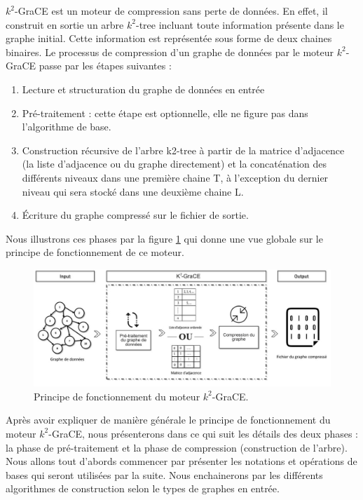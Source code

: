 \documentclass[a4paper,oneside,12pt]{report}
\theoremstyle{definition}
\begin{document}
	
$k^2$-GraCE est un moteur de compression sans perte de données. En effet, il construit en sortie un arbre $k^2$-tree incluant toute information présente dans le graphe initial. Cette information est représentée sous forme de deux chaines binaires. Le processus de compression d'un graphe de données par le moteur $k^2$-GraCE passe par les étapes suivantes :
\begin{enumerate}
\item Lecture et structuration du graphe de données en entrée 
\item Pré-traitement : cette étape est optionnelle, elle ne figure pas dans l'algorithme de base. 
\item Construction récursive de l'arbre k2-tree à partir de la matrice d'adjacence (la liste d'adjacence ou du graphe directement) et la concaténation des différents niveaux dans une première chaine T, à l'exception du dernier niveau qui sera stocké dans une deuxième chaine L.

\item Écriture du graphe compressé sur le fichier de sortie.
\end{enumerate}

Nous illustrons ces phases par la figure \ref{k2grace} qui donne une vue globale sur le principe de fonctionnement de ce moteur.


\begin{figure}[H]
\includegraphics[scale=0.48]{./ressources/image/ograce.jpg}
\caption[Principe de fonctionnement du moteur $k^2$-GraCE]{Principe de fonctionnement du moteur $k^2$-GraCE.}
			\label{k2grace}
\end{figure}
Après avoir expliquer de manière générale le principe de fonctionnement du moteur $k^2$-GraCE, nous présenterons dans ce qui suit les détails des deux phases : la phase de pré-traitement et la phase de compression (construction de l'arbre). Nous allons tout d'abords commencer par présenter les notations et opérations de bases qui seront utilisées par la suite. Nous enchainerons par les différents algorithmes de construction selon le types de graphes en entrée.
		
\end{document}
